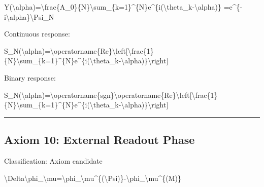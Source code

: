\documentclass[
  a4paper]{article}
\newenvironment{Shaded}{}{}
\newcommand{\NormalTok}[1]{#1}
\begin{document}
\begin{Shaded}
\begin{Highlighting}[]
\NormalTok{Y(\textbackslash{}alpha)=\textbackslash{}frac\{A\_0\}\{N\}\textbackslash{}sum\_\{k=1\}\^{}\{N\}e\^{}\{i(\textbackslash{}theta\_k{-}\textbackslash{}alpha)\}}
\NormalTok{=e\^{}\{{-}i\textbackslash{}alpha\}\textbackslash{}Psi\_N}
\end{Highlighting}
\end{Shaded}

Continuous response:

\begin{Shaded}
\begin{Highlighting}[]
\NormalTok{S\_N(\textbackslash{}alpha)=\textbackslash{}operatorname\{Re\}\textbackslash{}left[\textbackslash{}frac\{1\}\{N\}\textbackslash{}sum\_\{k=1\}\^{}\{N\}e\^{}\{i(\textbackslash{}theta\_k{-}\textbackslash{}alpha)\}\textbackslash{}right]}
\end{Highlighting}
\end{Shaded}

Binary response:

\begin{Shaded}
\begin{Highlighting}[]
\NormalTok{S\_N(\textbackslash{}alpha)=\textbackslash{}operatorname\{sgn\}\textbackslash{}operatorname\{Re\}\textbackslash{}left[\textbackslash{}frac\{1\}\{N\}\textbackslash{}sum\_\{k=1\}\^{}\{N\}e\^{}\{i(\textbackslash{}theta\_k{-}\textbackslash{}alpha)\}\textbackslash{}right]}
\end{Highlighting}
\end{Shaded}

\begin{center}\rule{0.5\linewidth}{0.5pt}\end{center}

\subsection{Axiom 10: External Readout
Phase}\label{axiom-10-external-readout-phase}

Classification: Axiom candidate

\begin{Shaded}
\begin{Highlighting}[]
\NormalTok{\textbackslash{}Delta\textbackslash{}phi\_\textbackslash{}mu=\textbackslash{}phi\_\textbackslash{}mu\^{}\{(\textbackslash{}Psi)\}{-}\textbackslash{}phi\_\textbackslash{}mu\^{}\{(M)\}}
\end{Highlighting}
\end{Shaded}
\end{document}
